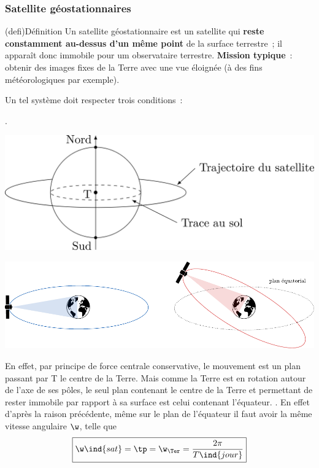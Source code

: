 \documentclass[../../main/main.tex]{subfiles}
\begin{document}
\subsubsection{Satellite géostationnaires}
\begin{tcb*}[sidebyside](defi){Définition}
	Un satellite géostationnaire est un satellite qui \textbf{reste constamment
		au-dessus d'un même point} de la surface terrestre~; il apparaît donc
	immobile pour um observataire terrestre.
	\tcblower
	\textbf{Mission typique}~: obtenir des images fixes de la Terre avec une vue
	éloignée (à des fins météorologiques par exemple).
\end{tcb*}
Un tel système doit respecter trois conditions~:
\begin{enumerate}
	.
	\smallbreak
	\begin{isd}
		\begin{center}
			\includegraphics[width=\linewidth]{sat_geo}
		\end{center}
		\tcblower
		\begin{center}
			\includegraphics[width=\linewidth]{sat_geo_plan}
		\end{center}
	\end{isd}
	En effet, par principe de force centrale conservative, le mouvement est
	un plan passant par T le centre de la Terre. Mais comme la Terre est en
	rotation autour de l'axe de ses pôles, le seul plan contenant le centre
	de la Terre et permettant de rester immobile par rapport à sa surface
	est celui contenant l'équateur.
	. En effet d'après la raison précédente, même sur le plan de
	l'équateur il faut avoir la même vitesse angulaire $\w$, telle que
	\[\boxed{\w\ind{sat} = \tp = \w_\Ter = \frac{2\pi}{T\ind{jour}}}\]
\end{enumerate}
\end{document}
